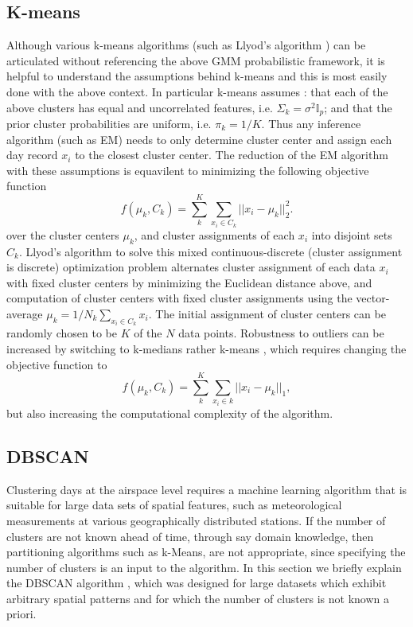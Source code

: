 \documentclass[11pt]{amsart}
\begin{document}
\subsection{K-means}
Although various k-means algorithms (such as Llyod's algorithm \cite{lange1999numerical}) can be articulated without referencing the above GMM probabilistic framework, it is helpful to understand the assumptions behind k-means and this is most easily done with the above context.  In particular k-means assumes \cite{murphy}:  that each of the above clusters has equal and uncorrelated features, i.e. $\Sigma_k=\sigma^2\mathbb{I}_p$; and that the prior cluster probabilities are uniform, i.e. $\pi_k=1/K$.  Thus any inference algorithm (such as EM) needs to only determine cluster center and assign each day record $x_i$ to the closest cluster center.  The reduction of the EM algorithm with these assumptions is equavilent to minimizing the following objective function
\begin{equation}
f(\mu_k,C_k) = \sum_k^K \sum_{x_i\in C_k} ||x_i-\mu_k||^2_2.
\end{equation}
over the cluster centers $\mu_k$, and cluster assignments of each $x_i$ into disjoint sets $C_k$.  Llyod's algorithm to solve this mixed continuous-discrete (cluster assignment is discrete) optimization problem \cite{lange1999numerical} alternates cluster assignment of each data $x_i$ with fixed cluster centers by minimizing the Euclidean distance above, and computation of cluster centers with fixed cluster assignments using the vector-average $\mu_k=1/N_k\sum_{x_i\in C_k}x_i$.  The initial assignment of cluster centers can be randomly chosen to be $K$ of the $N$ data points.  Robustness to outliers can be increased by switching to k-medians rather k-means \cite{lange1999numerical}, which requires changing the objective function to
\begin{equation}
f(\mu_k,C_k) = \sum_k^K \sum_{x_i\in k} ||x_i-\mu_k||_1,
\end{equation}
but also increasing the computational complexity of the algorithm.




\subsection{DBSCAN}
Clustering days at the airspace level requires a machine learning algorithm that is suitable for large data sets of spatial features, such as meteorological measurements at various geographically distributed stations.  If the number of clusters are not known ahead of time, through say domain knowledge, then partitioning algorithms such as k-Means, are not appropriate, since specifying the number of clusters is an input to the algorithm.  In this section we briefly explain the DBSCAN algorithm \cite{ester1996density}, which was designed for large datasets which exhibit arbitrary spatial patterns and for which the number of clusters is not known a priori.
\end{document}
